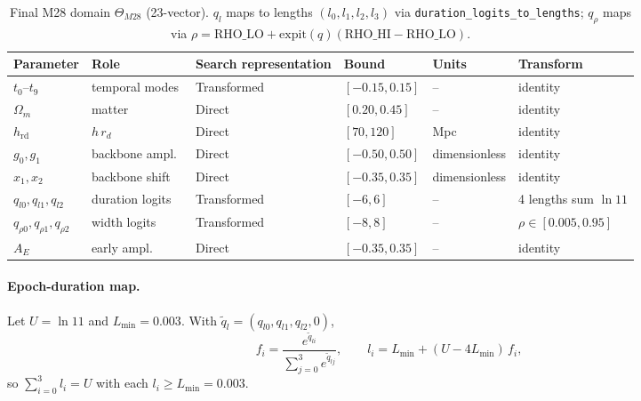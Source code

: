 \begin{table}[!htbp]
\centering
\footnotesize\setlength{\tabcolsep}{3pt}
\begin{tabular}{llllll}
\toprule
Parameter & Role & Search representation & Bound & Units & Transform \\
\midrule
$t_{0}$--$t_{9}$ & temporal modes & Transformed & $[-0.15,0.15]$ & -- & identity \\
$\Omega_{m}$ & matter & Direct & $[0.20,0.45]$ & -- & identity \\
$h_{\mathrm{rd}}$ & $h\,r_{d}$ & Direct & $[70,120]$ & Mpc & identity \\
$g_{0},g_{1}$ & backbone ampl.\ & Direct & $[-0.50,0.50]$ & dimensionless & identity \\
$x_{1},x_{2}$ & backbone shift & Direct & $[-0.35,0.35]$ & dimensionless & identity \\
$q_{l0},q_{l1},q_{l2}$ & duration logits & Transformed & $[-6,6]$ & -- & 4 lengths sum $\ln 11$ \\
$q_{\rho0},q_{\rho1},q_{\rho2}$ & width logits & Transformed & $[-8,8]$ & -- & $\rho\in[0.005,0.95]$ \\
$A_{E}$ & early ampl.\ & Direct & $[-0.35,0.35]$ & -- & identity \\
\bottomrule
\end{tabular}
\caption{Final M28 domain $\Theta_{M28}$ (23-vector). $q_{l}$ maps to
lengths $(l_{0},l_{1},l_{2},l_{3})$ via
\texttt{duration\_logits\_to\_lengths}; $q_{\rho}$ maps via
$\rho=\mathrm{RHO\_LO}+\mathrm{expit}(q)(\mathrm{RHO\_HI}-\mathrm{RHO\_LO})$.}
\label{tab:m28-domain}
\end{table}

\paragraph{Epoch-duration map.}
Let $U = \ln 11$ and $L_{\min} = 0.003$. With
$\tilde{q}_{l} = (q_{l0},q_{l1},q_{l2},0)$,
\begin{equation}
f_{i} = \frac{e^{\tilde{q}_{li}}}{\sum_{j=0}^{3} e^{\tilde{q}_{lj}}},
\qquad
\boxed{l_{i} = L_{\min} + (U - 4L_{\min})\, f_{i}},
\end{equation}
so $\sum_{i=0}^{3} l_{i} = U$ with each $l_{i} \ge L_{\min} = 0.003$.

